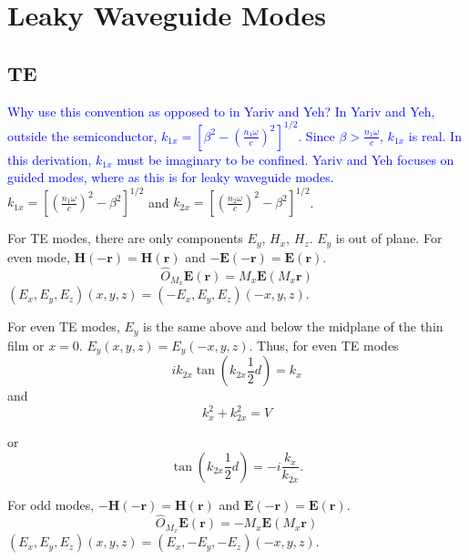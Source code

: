 \documentclass[12pt]{article}
\date{\today }
\author{
Paul W. Leu\\
University of Pittsburgh\\
Pittsburgh, PA}
\numberwithin{equation}{section}
\newcommand{\blue}[1]{\textcolor{blue}{#1}} %
\begin{document}
\tableofcontents

\section{Leaky Waveguide Modes}

\subsection{TE}
\blue{Why use this convention as opposed to in Yariv and Yeh?  In Yariv and Yeh, 
outside the semiconductor, 
$k_{1x} = \left [  \beta^2  -  \left ( \frac{n_1 \omega}{c} \right )^2  \right ] ^{1/2}$.  Since $\beta >  \frac{n_1 \omega}{c}$, $k_{1x}$ is real.
In this derivation, $k_{1x}$ must be imaginary to be confined.  Yariv and Yeh focuses on guided modes, where as this is for leaky waveguide modes.}\\
$k_{1x} = \left [  \left ( \frac{n_1 \omega}{c} \right )^2 - \beta^2    \right ] ^{1/2}$
and 
$k_{2x} = \left [  \left ( \frac{n_2 \omega}{c} \right )^2 - \beta^2    \right ] ^{1/2}$.  

For TE modes, there are only components $E_y$, $H_x$, $H_z$.  $E_y$ is out of plane.  
For even mode, $\mathbf{H}(- \mathbf{r}) = \mathbf{H} ( \mathbf{r} )$ and 
$- \mathbf{E}(- \mathbf{r}) = \mathbf{E} ( \mathbf{r} )$.
\begin{equation}
\hat{O}_{M_x} \mathbf{E} (\mathbf{r}) = M_x \mathbf{E} ( M_x \mathbf{r})
\end{equation}
$(E_x, E_y, E_z) (x, y, z) = (-E_x, E_y, E_z) (-x, y, z) $.

For even TE modes, $E_y$ is the same above and below the midplane of the thin film or $x = 0$.  
$E_y (x, y, z) = E_y (-x, y, z) $.  Thus, for even TE modes
\begin{equation}
i k_{2x} \tan (k_{2x} \frac{1}{2} d ) = k_x
\end{equation}
and 
\begin{equation}
k_x^2 + k_{2x}^2 = V
\end{equation}


or 
\begin{equation}
\boxed{\tan (k_{2x} \frac{1}{2} d ) = - i \frac{k_x}{k_{2x}}.}
\end{equation}


For odd modes, 
$-\mathbf{H}(- \mathbf{r}) = \mathbf{H} ( \mathbf{r} )$ and 
$\mathbf{E}(- \mathbf{r}) = \mathbf{E} (\mathbf{r} )$.  
\begin{equation}
\hat{O}_{M_x} \mathbf{E} (\mathbf{r}) = - M_x \mathbf{E} ( M_x \mathbf{r})
\end{equation}
$(E_x, E_y, E_z) (x, y, z) = (E_x, -E_y, -E_z) (-x, y, z) $.
\end{document}
